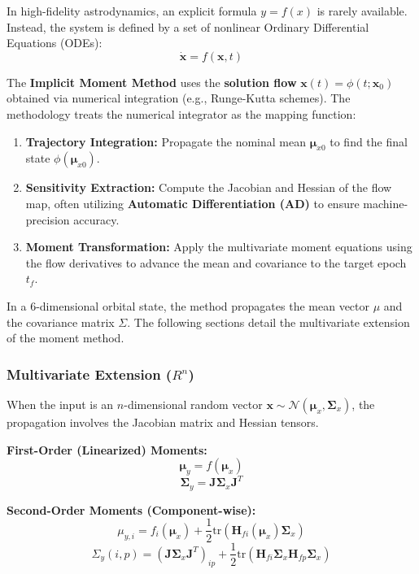 \documentclass[
  letterpaper,
  DIV=11,
  numbers=noendperiod,
  oneside]{scrartcl}
\begin{document}
In high-fidelity astrodynamics, an explicit formula \(y = f(x)\) is
rarely available. Instead, the system is defined by a set of nonlinear
Ordinary Differential Equations (ODEs):
\[\dot{\mathbf{x}} = f(\mathbf{x}, t)\]

The \textbf{Implicit Moment Method} uses the \textbf{solution flow}
\(\mathbf{x}(t)=\phi(t; \mathbf{x}_0)\) obtained via numerical
integration (e.g., Runge-Kutta schemes). The methodology treats the
numerical integrator as the mapping function:

\begin{enumerate}
\def\labelenumi{\arabic{enumi}.}
\item
  \textbf{Trajectory Integration:} Propagate the nominal mean
  \(\boldsymbol{\mu}_{x0}\) to find the final state
  \(\phi(\boldsymbol{\mu}_{x0})\).
\item
  \textbf{Sensitivity Extraction:} Compute the Jacobian and Hessian of
  the flow map, often utilizing \textbf{Automatic Differentiation (AD)}
  to ensure machine-precision accuracy.
\item
  \textbf{Moment Transformation:} Apply the multivariate moment
  equations using the flow derivatives to advance the mean and
  covariance to the target epoch \(t_f\).
\end{enumerate}

In a 6-dimensional orbital state, the method propagates the mean vector
\(\mu\) and the covariance matrix \(\Sigma\). The following sections
detail the multivariate extension of the moment method.

\subsubsection{\texorpdfstring{Multivariate Extension
(\(R^n\))}{Multivariate Extension (R\^{}n)}}\label{multivariate-extension-rn}

When the input is an \(n\)-dimensional random vector
\(\mathbf{x} \sim \mathcal{N}(\boldsymbol{\mu}_x, \mathbf{\Sigma}_x)\),
the propagation involves the Jacobian matrix and Hessian tensors.

\textbf{First-Order (Linearized) Moments:}
\[\boldsymbol{\mu}_y = f(\boldsymbol{\mu}_x)\]
\[\mathbf{\Sigma}_y = \mathbf{J} \mathbf{\Sigma}_x \mathbf{J}^T\]

\textbf{Second-Order Moments (Component-wise):}
\[\mu_{y,i} = f_i(\boldsymbol{\mu}_x) + \frac{1}{2} \text{tr}(\mathbf{H}_{fi}(\boldsymbol{\mu}_x) \mathbf{\Sigma}_x)\]
\[
\Sigma_y(i, p) = (\mathbf{J} \mathbf{\Sigma}_x \mathbf{J}^T)_{ip} + \frac{1}{2} \text{tr}(\mathbf{H}_{fi} \mathbf{\Sigma}_x \mathbf{H}_{fp} \mathbf{\Sigma}_x)
\]
\end{document}
